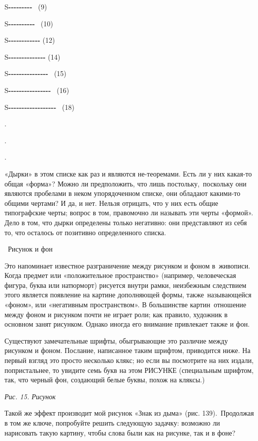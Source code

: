 S\textbf{-\/-\/-\/-\/-\/-\/-\/-\/-} ~(9)

S\textbf{-\/-\/-\/-\/-\/-\/-\/-\/-\/-} ~(10)

S\textbf{-\/-\/-\/-\/-\/-\/-\/-\/-\/-\/-\/-} (12)

S\textbf{-\/-\/-\/-\/-\/-\/-\/-\/-\/-\/-\/-\/-\/-} (14)

S\textbf{-\/-\/-\/-\/-\/-\/-\/-\/-\/-\/-\/-\/-\/-\/-} ~(15)

S\textbf{-\/-\/-\/-\/-\/-\/-\/-\/-\/-\/-\/-\/-\/-\/-\/-} ~(16)

S\textbf{-\/-\/-\/-\/-\/-\/-\/-\/-\/-\/-\/-\/-\/-\/-\/-\/-\/-} ~(18)

.

.

.

«Дырки» в этом списке как раз и являются не-теоремами. Есть ли у них какая-то общая «форма»? Можно ли предположить, что лишь постольку,~поскольку они являются пробелами в неком упорядоченном списке, они обладают какими-то общими чертами? И да, и нет. Нельзя отрицать, что у них есть общие типографские черты; вопрос в том, правомочно ли называть эти черты «формой». Дело в том, что дырки определены только негативно: они представляют из себя то, что осталось от позитивно определенного списка.

~Рисунок и фон

Это напоминает известное разграничение между рисунком и фоном в~живописи. Когда предмет или «положительное пространство» (например, человеческая фигура, буква или натюрморт) рисуется внутри рамки, неизбежным следствием этого является появление на картине дополняющей формы, также~называющейся «фоном», или «негативным пространством». В большинстве картин~отношение между фоном и рисунком почти не играет роли; как правило, художник в основном занят рисунком. Однако иногда его внимание привлекает также и фон.

Существуют замечательные шрифты, обыгрывающие это различие между рисунком и фоном. Послание, написанное таким шрифтом, приводится ниже. На первый взгляд это просто несколько клякс; но если вы посмотрите на них издали, попристальнее, то увидите семь букв на этом РИСУНКЕ (специальным шрифтом, так, что черный фон, создающий белые буквы, похож на кляксы.)

\emph{Рис. 15. Рисунок}

Такой же эффект производит мой рисунок «Знак из дыма» (рис. 139).~Продолжая в том же ключе, попробуйте решить следующую задачку: возможно ли нарисовать такую картину, чтобы слова были как на рисунке, так и в фоне?

